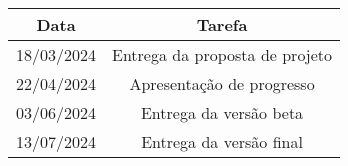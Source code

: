\begin{table}[h]
    \centering
    \label{tab:planning}
    \begin{tabular}{|c|c|}
        \hline
        Data       & Tarefa                         \\
        \hline
        18/03/2024 & Entrega da proposta de projeto \\
        22/04/2024 & Apresentação de progresso      \\
        03/06/2024 & Entrega da versão beta         \\
        13/07/2024 & Entrega da versão final        \\
        \hline
    \end{tabular}
\end{table}
